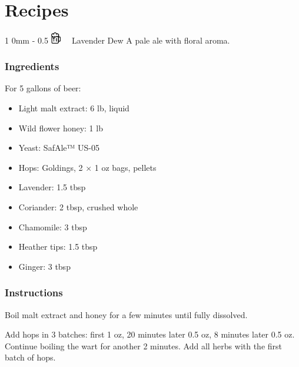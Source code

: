 \documentclass[12pt,letterpaper,oneside,titlepage]{book}
\newcommand{\x}{×\xspace}
\begin{document}

\makeatletter
\renewcommand{\section}{\@startsection
{section}%
{1}%
{0mm}%
{-\baselineskip}%
{0.5\baselineskip}%
{\hspace{-\parindent}%
\includegraphics[width=1.2em]{fig/mug-icon.pdf}%
~~\bfseries\Large}} %
\makeatother

\chapter{Recipes}
\section{Lavender Dew}
A pale ale with floral aroma.

\subsection{Ingredients}
For 5 gallons of beer:
\begin{itemize}[noitemsep]
  \item Light malt extract: 6 lb, liquid
  \item Wild flower honey: 1 lb
  \item Yeast: SafAle™ US-05
  \item Hops: Goldings, 2 \x 1 oz bags, pellets
  \item Lavender: 1.5 tbsp
  \item Coriander: 2 tbsp, crushed whole
  \item Chamomile: 3 tbsp
  \item Heather tips: 1.5 tbsp
  \item Ginger: 3 tbsp
\end{itemize}

\subsection{Instructions}

Boil malt extract and honey for a few minutes until fully dissolved.

Add hops in 3 batches:
first 1 oz, 20 minutes later 0.5 oz, 8 minutes later 0.5 oz.
Continue boiling the wart for another 2 minutes.
Add all herbs with the first batch of hops.
\end{document}
